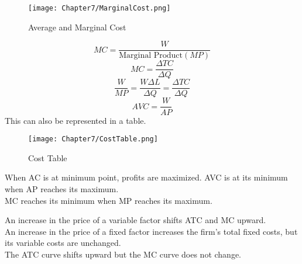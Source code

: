 \begin{figure}[H]
    \centering
    \texttt{[image: Chapter7/MarginalCost.png]}
    \caption{Average and Marginal Cost}
\end{figure}
\par
\begin{equation}
    MC = \frac{W}{\text{Marginal Product}(MP)}
\end{equation}
\begin{equation}
    MC = \frac{\Delta TC}{\Delta Q}
\end{equation}
\begin{equation}
    \frac{W}{MP} = \frac{W\Delta L}{\Delta Q} = \frac{\Delta TC}{\Delta Q}
\end{equation}
\begin{equation}
    AVC = \frac{W}{AP}
\end{equation}
This can also be represented in a table.
\begin{figure}[H]
    \centering
    \texttt{[image: Chapter7/CostTable.png]}
    \caption{Cost Table}
\end{figure}
When AC is at minimum point, profits are maximized.
AVC is at its minimum when AP reaches its maximum.\\
MC reaches its minimum when MP reaches its maximum.
\par
An increase in the price of a variable factor shifts ATC and MC upward.\\
An increase in the price of a fixed factor increases the firm's total fixed costs, but its variable costs are unchanged.\\
The ATC curve shifts upward but the MC curve does not change.